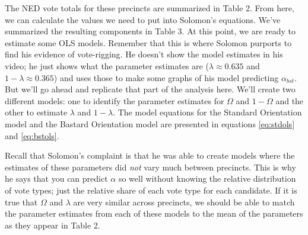 \documentclass[12pt]{article}
\begin{document}
The NED vote totals for these precincts are summarized in Table 2. From here, we can calculate the values we need to put into Solomon's equations. We've summarized the resulting components in Table 3. At this point, we are ready to estimate some OLS models. Remember that this is where Solomon purports to find his evidence of vote-rigging. He doesn't show the model estimates in his video; he just shows what the parameter estimates are (\(\lambda \approx 0.635\) and \(1-\lambda \approx 0.365\)) and uses those to make some graphs of his model predicting \(\alpha_{bst}\). But we'll go ahead and replicate that part of the analysis here. We'll create two different models: one to identify the parameter estimates for \(\Omega\) and \(1-\Omega\) and the other to estimate \(\lambda\) and \(1-\lambda\). The model equations for the Standard Orientation model and the Bastard Orientation model are presented in equations \eqref{eq:stdols} and \eqref{eq:bstols}.

\begin{table}[!htbp] \centering \renewcommand*{\arraystretch}{1.1}\caption{Summary Statistics}
\end{table}

Recall that Solomon's complaint is that he was able to create models where the estimates of these parameters did \emph{not} vary much between precincts. This is why he says that you can predict \(\alpha\) so well without knowing the relative distribution of vote types; just the relative share of each vote type for each candidate. If it is true that \(\Omega\) and \(\lambda\) are very similar across precincts, we should be able to match the parameter estimates from each of these models to the mean of the parameters as they appear in Table 2.
\end{document}
